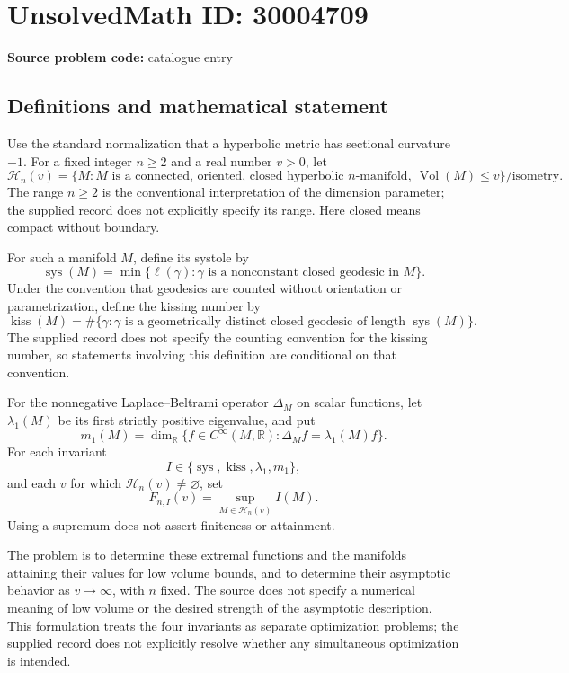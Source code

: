 \documentclass[11pt]{article}
\newcommand{\R}{\mathbb{R}}
\begin{document}
\section*{UnsolvedMath ID: 30004709}
\textbf{Source problem code:} catalogue entry
\subsection{Definitions and mathematical statement}
Use the standard normalization that a hyperbolic metric has sectional curvature \(-1\). For a fixed integer \(n\geq 2\) and a real number \(v>0\), let
\[
\mathcal H_n(v)=\{M: M\text{ is a connected, oriented, closed hyperbolic }n\text{-manifold},\ \operatorname{Vol}(M)\leq v\}/\text{isometry}.
\]
The range \(n\geq2\) is the conventional interpretation of the dimension parameter; the supplied record does not explicitly specify its range. Here closed means compact without boundary.

For such a manifold \(M\), define its systole by
\[
\operatorname{sys}(M)=\min\{\ell(\gamma):\gamma\text{ is a nonconstant closed geodesic in }M\}.
\]
Under the convention that geodesics are counted without orientation or parametrization, define the kissing number by
\[
\operatorname{kiss}(M)=\#\{\gamma:\gamma\text{ is a geometrically distinct closed geodesic of length }\operatorname{sys}(M)\}.
\]
The supplied record does not specify the counting convention for the kissing number, so statements involving this definition are conditional on that convention.

For the nonnegative Laplace--Beltrami operator \(\Delta_M\) on scalar functions, let \(\lambda_1(M)\) be its first strictly positive eigenvalue, and put
\[
m_1(M)=\dim_{\R}\{f\in C^\infty(M,\R):\Delta_M f=\lambda_1(M)f\}.
\]
For each invariant
\[
I\in\{\operatorname{sys},\operatorname{kiss},\lambda_1,m_1\},
\]
and each \(v\) for which \(\mathcal H_n(v)\neq\varnothing\), set
\[
F_{n,I}(v)=\sup_{M\in\mathcal H_n(v)} I(M).
\]
Using a supremum does not assert finiteness or attainment.

The problem is to determine these extremal functions and the manifolds attaining their values for low volume bounds, and to determine their asymptotic behavior as \(v\to\infty\), with \(n\) fixed. The source does not specify a numerical meaning of low volume or the desired strength of the asymptotic description. This formulation treats the four invariants as separate optimization problems; the supplied record does not explicitly resolve whether any simultaneous optimization is intended.
\end{document}
